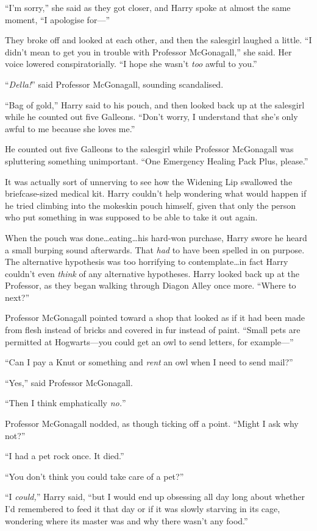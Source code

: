 “I’m sorry,” she said as they got closer, and Harry spoke at almost the same moment, “I apologise for—”

They broke off and looked at each other, and then the salesgirl laughed a little. “I didn’t mean to get you in trouble with Professor McGonagall,” she said. Her voice lowered conspiratorially. “I hope she wasn’t \emph{too} awful to you.”

“\emph{Della!}” said Professor McGonagall, sounding scandalised.

“Bag of gold,” Harry said to his pouch, and then looked back up at the salesgirl while he counted out five Galleons. “Don’t worry, I understand that she’s only awful to me because she loves me.”

He counted out five Galleons to the salesgirl while Professor McGonagall was spluttering something unimportant. “One Emergency Healing Pack Plus, please.”

It was actually sort of unnerving to see how the Widening Lip swallowed the briefcase-sized medical kit. Harry couldn’t help wondering what would happen if he tried climbing into the mokeskin pouch himself, given that only the person who put something in was supposed to be able to take it out again.

When the pouch was done…eating…his hard-won purchase, Harry
swore he heard a small burping sound afterwards. That \emph{had} to have been spelled in on purpose. The alternative hypothesis was too horrifying to contemplate…in fact Harry couldn’t even \emph{think} of any alternative hypotheses. Harry looked back up at the Professor, as they began walking through Diagon Alley once more. “Where to next?”

Professor McGonagall pointed toward a shop that looked as if it had been made from flesh instead of bricks and covered in fur instead of paint. “Small pets are permitted at Hogwarts—you could get an owl to send letters, for example—”

“Can I pay a Knut or something and \emph{rent} an owl when I need to send mail?”

“Yes,” said Professor McGonagall.

“Then I think emphatically \emph{no.}”

Professor McGonagall nodded, as though ticking off a point. “Might I ask why not?”

“I had a pet rock once. It died.”

“You don’t think you could take care of a pet?”

“I \emph{could,}” Harry said, “but I would end up obsessing all day long about whether I’d remembered to feed it that day or if it was slowly starving in its cage, wondering where its master was and why there wasn’t any food.”

